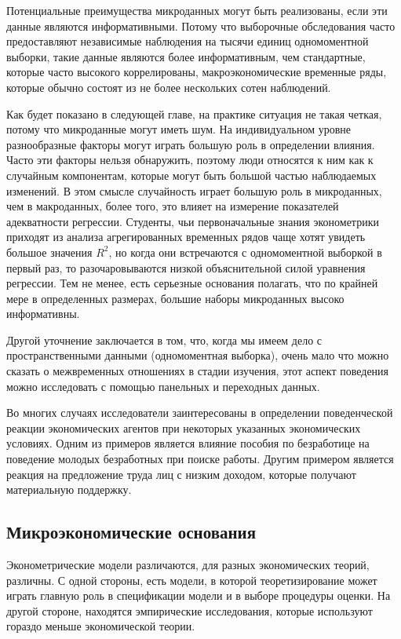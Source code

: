 	Потенциальные преимущества микроданных могут быть реализованы, если эти данные являются информативными. Потому что выборочные обследования часто предоставляют независимые наблюдения на тысячи единиц одномоментной выборки, такие данные являются более информативным, чем стандартные, которые часто высокого коррелированы, макроэкономические временные ряды, которые  обычно состоят из не более нескольких сотен наблюдений.
	
	
	Как будет показано в следующей главе, на практике ситуация не такая четкая, потому что микроданные могут иметь  шум. На индивидуальном уровне разнообразные факторы могут играть большую роль в определении влияния. Часто эти факторы нельзя обнаружить, поэтому люди относятся к ним как к случайным компонентам, которые могут быть большой частью наблюдаемых изменений. В этом смысле случайность играет большую роль в микроданных, чем в макроданных, более того, это влияет на измерение показателей адекватности регрессии. Студенты, чьи первоначальные знания эконометрики приходят из анализа агрегированных временных рядов чаще хотят увидеть большое значения $R^{2}$, но когда они встречаются с одномоментной выборкой в первый раз, то разочаровываются низкой объяснительной силой уравнения регрессии. Тем не менее, есть серьезные основания полагать, что по крайней мере в определенных размерах, большие наборы микроданных высоко информативны.
	
	
	Другой уточнение заключается в том, что, когда мы имеем дело с пространственными данными (одномоментная выборка), очень мало что можно сказать о межвременных отношениях в стадии изучения, этот  аспект поведения можно исследовать с помощью панельных и переходных данных.
	
	
	Во многих случаях исследователи заинтересованы в определении поведенческой реакции экономических агентов при некоторых указанных экономических условиях. Одним из примеров является влияние пособия по безработице на поведение молодых безработных при поиске работы. Другим примером является реакция на предложение труда лиц с низким доходом, которые получают материальную поддержку. 
	
\subsection{Микроэкономические основания}

	Эконометрические модели различаются, для разных экономических теорий, различны. С одной стороны, есть модели, в которой теоретизирование может играть главную роль в спецификации модели и в выборе процедуры оценки. На другой стороне, находятся эмпирические исследования, которые используют гораздо меньше экономической теории.
	
